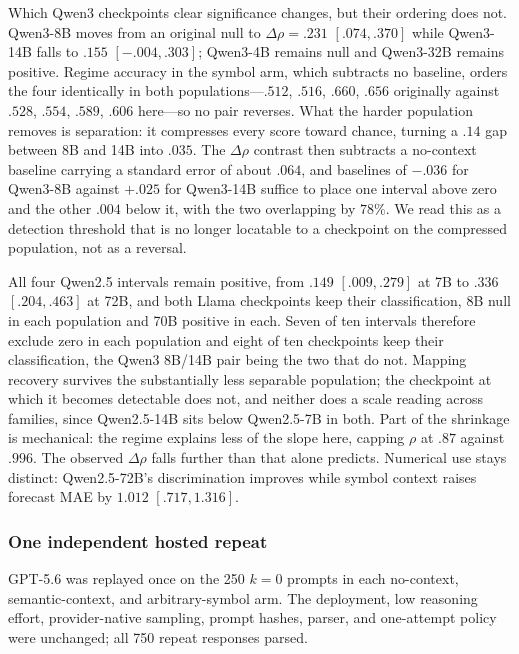Which Qwen3 checkpoints clear significance changes, but their ordering does not.
Qwen3-8B moves from an original null to \(\Delta\rho=.231\) \([.074,.370]\) while
Qwen3-14B falls to \(.155\) \([-.004,.303]\); Qwen3-4B remains null and Qwen3-32B
remains positive. Regime accuracy in the symbol arm, which subtracts no baseline,
orders the four identically in both populations---\(.512\), \(.516\), \(.660\),
\(.656\) originally against \(.528\), \(.554\), \(.589\), \(.606\) here---so no
pair reverses. What the harder population removes is separation: it compresses
every score toward chance, turning a \(.14\) gap between 8B and 14B into \(.035\).
The \(\Delta\rho\) contrast then subtracts a no-context baseline carrying a
standard error of about \(.064\), and baselines of \(-.036\) for Qwen3-8B against
\(+.025\) for Qwen3-14B suffice to place one interval above zero and the other
\(.004\) below it, with the two overlapping by \(78\%\). We read this as a
detection threshold that is no longer locatable to a checkpoint on the compressed
population, not as a reversal.

All four Qwen2.5 intervals remain positive, from \(.149\) \([.009,.279]\) at 7B to
\(.336\) \([.204,.463]\) at 72B, and both Llama checkpoints keep their
classification, 8B null in each population and 70B positive in each. Seven of ten
intervals therefore exclude zero in each population and eight of ten checkpoints
keep their classification, the Qwen3 8B/14B pair being the two that do not. Mapping
recovery survives the substantially less separable population; the checkpoint at
which it becomes detectable does not, and neither does a scale reading across
families, since Qwen2.5-14B sits below Qwen2.5-7B in both. Part of the shrinkage
is mechanical: the regime explains less of the slope here, capping \(\rho\) at
\(.87\) against \(.996\). The observed \(\Delta\rho\) falls further than that alone
predicts. Numerical use stays distinct:
Qwen2.5-72B's discrimination improves while symbol context raises forecast MAE by
\(1.012\) \([.717,1.316]\).


\subsubsection{One independent hosted repeat}
GPT-5.6 was replayed once on the 250 \(k=0\) prompts in each no-context,
semantic-context, and arbitrary-symbol arm. The deployment, low reasoning effort,
provider-native sampling, prompt hashes, parser, and one-attempt policy were
unchanged; all 750 repeat responses parsed.

